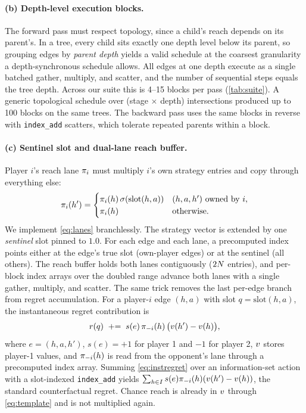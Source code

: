 \paragraph{(b) Depth-level execution blocks.}
The forward pass must respect topology, since a child's reach depends on its
parent's. In a tree, every child sits exactly one depth level below its parent, so
grouping edges by \emph{parent depth} yields a valid schedule at the coarsest
granularity a depth-synchronous schedule allows. All edges at one depth execute as a
single batched gather, multiply, and scatter, and the number of sequential steps
equals the tree depth. Across our suite this is 4--15 blocks per pass
(\cref{tab:suite}). A generic topological schedule over (stage $\times$ depth)
intersections produced up to 100 blocks on the same trees. The backward pass uses the same blocks
in reverse with \texttt{index\_add} scatters, which tolerate repeated parents within
a block.

\paragraph{(c) Sentinel slot and dual-lane reach buffer.}
Player $i$'s reach lane $\pi_i$ must multiply $i$'s own strategy entries and copy
through everything else:
\begin{equation}
    \pi_i(h') =
    \begin{cases}
        \pi_i(h)\, \sigma(\mathrm{slot}(h,a)) & (h,a,h') \text{ owned by } i,\\
        \pi_i(h) & \text{otherwise}.
    \end{cases}
    \label{eq:lanes}
\end{equation}
We implement \cref{eq:lanes} branchlessly. The strategy vector is extended by one \emph{sentinel} slot pinned to $1.0$. For
each edge and each lane, a precomputed index points either at the edge's true slot
(own-player edges) or at the sentinel (all others). The reach buffer holds both lanes contiguously ($2N$ entries), and
per-block index arrays over the doubled range advance both lanes with a single
gather, multiply, and scatter. The same trick removes the last per-edge branch from regret accumulation. For a
player-$i$ edge $(h, a)$ with slot $q = \mathrm{slot}(h,a)$, the instantaneous
regret contribution is
\begin{equation}
    r(q) \;\mathrel{+}=\; s(e)\,\pi_{-i}(h)\,\big(v(h') - v(h)\big),
    \label{eq:instregret}
\end{equation}
where $e=(h,a,h')$, $s(e)=+1$ for player 1 and $-1$ for player 2,
$v$ stores player-1 values, and $\pi_{-i}(h)$ is read from the
opponent's lane through a precomputed index array. Summing \cref{eq:instregret} over an information-set action with a slot-indexed
\texttt{index\_add} yields $\sum_{h\in I}s(e)\pi_{-i}(h)(v(h')-v(h))$,
the standard counterfactual regret. Chance reach is already in $v$ through
\cref{eq:template} and is not multiplied again.

